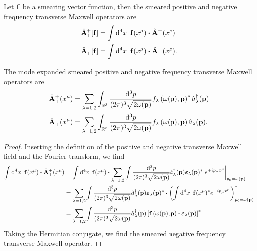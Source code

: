 \begin{definition}\label{def:qmw_transverse_pn_smeared}
	Let $\vb{f}$ be a smearing vector function, then the smeared positive and negative frequency transverse Maxwell operators are
	\begin{align}
		\label{eq:qmw_transverse_pn_smeared}
		\hat{\vb{A}}_\perp^+[\vb{f}]
		&=
		\int\dd[4]{x}\
		\vb{f}(x^\mu)
		\vdot
		\hat{\vb{A}}_\perp^+(x^\mu)
		\\
		\hat{\vb{A}}_\perp^-[\vb{f}]
		&=
		\int\dd[4]{x}\
		\vb{f}(x^\mu)
		\vdot
		\hat{\vb{A}}_\perp^-(x^\mu)
		.
	\end{align}
\end{definition}
\begin{lemma}\label{thm:qmw_transverse_pn_smeared}
	The mode expanded smeared positive and negative frequency transverse Maxwell operators are
	\begin{align}
		\label{eq:qmw_transverse_pn}
		\hat{\vb{A}}^+_\perp(x^\mu)
		&=
		\sum_{\lambda=1,2}
		\int_{\mathbb{R}^3}\frac{\dd[3]{p}}{(2\pi)^3\sqrt{2\omega(\vb{p})}}
		f_\lambda\left(\omega(\vb{p}),\vb{p}\right)^*
		\hat{a}_\lambda^\dagger(\vb{p})
		\\
		\hat{\vb{A}}^-_\perp(x^\mu)
		&=
		\sum_{\lambda=1,2}
		\int_{\mathbb{R}^3}\frac{\dd[3]{p}}{(2\pi)^3\sqrt{2\omega(\vb{p})}}
		f_\lambda\left(\omega(\vb{p}),\vb{p}\right)
		\hat{a}_\lambda(\vb{p})
		.
	\end{align}	
\end{lemma}
\begin{proof}
	Inserting the definition of the positive and negative transverse Maxwell field and the Fourier transform, we find
	\begin{equation*}
		\begin{split}
			\int\dd[4]{x}\
			\vb{f}(x^\mu)
			\vdot
			\hat{\vb{A}}_\perp^+(x^\mu)
			&=
			\int\dd[4]{x}\
			\vb{f}(x^\mu)
			\vdot
			\sum_{\lambda=1,2}
			\int\frac{\dd[3]{p}}{(2\pi)^3\sqrt{2\omega(\vb{p})}}
			\hat{a}_\lambda^\dagger(\vb{p})
			\boldsymbol{\varepsilon}_\lambda(\vb{p})^*
			\eval{e^{+ip_\mu x^\mu}}_{p_0=\omega(\vb{p})}
			\\
			&=
			\sum_{\lambda=1,2}
			\int\frac{\dd[3]{p}}{(2\pi)^3\sqrt{2\omega(\vb{p})}}
			\hat{a}_\lambda^\dagger(\vb{p})
			\boldsymbol{\varepsilon}_\lambda(\vb{p})^*
			\vdot
			\left(
				\int\dd[4]{x}\
				\vb{f}(x^\mu)^*
				e^{-ip_\mu x^\mu}
			\right)_{p_0=\omega(\vb{p})}^*
			\\
			&=
			\sum_{\lambda=1,2}
			\int\frac{\dd[3]{p}}{(2\pi)^3\sqrt{2\omega(\vb{p})}}
			\hat{a}_\lambda^\dagger(\vb{p})
			\left[
				\vb{f}\left(\omega(\vb{p}),\vb{p}\right)
				\vdot
				\boldsymbol{\varepsilon}_\lambda(\vb{p})
			\right]^*
			.
		\end{split}
	\end{equation*}
	Taking the Hermitian conjugate, we find the smeared negative frequency transverse Maxwell operator.
\end{proof}
